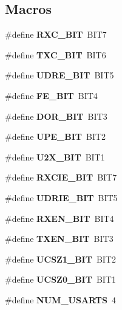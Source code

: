 \subsection*{Macros}
\begin{DoxyCompactItemize}
\item 
\#define {\bfseries R\+X\+C\+\_\+\+B\+I\+T}~B\+I\+T7\label{group__usart_async_module_ga2133aeaf30d1d8f6f819d2252dcdbe8c}

\item 
\#define {\bfseries T\+X\+C\+\_\+\+B\+I\+T}~B\+I\+T6\label{group__usart_async_module_ga6baa91108d3c2d172e44bc70956b98d2}

\item 
\#define {\bfseries U\+D\+R\+E\+\_\+\+B\+I\+T}~B\+I\+T5\label{group__usart_async_module_ga774a9a790e2e547044eddf47e931a1f8}

\item 
\#define {\bfseries F\+E\+\_\+\+B\+I\+T}~B\+I\+T4\label{group__usart_async_module_gaaee51057462df51f411e67a131165914}

\item 
\#define {\bfseries D\+O\+R\+\_\+\+B\+I\+T}~B\+I\+T3\label{group__usart_async_module_ga42bba56b7ce519d770f6791da46b3f64}

\item 
\#define {\bfseries U\+P\+E\+\_\+\+B\+I\+T}~B\+I\+T2\label{group__usart_async_module_gaaa081c9d68175cca9b7a57927616baf1}

\item 
\#define {\bfseries U2\+X\+\_\+\+B\+I\+T}~B\+I\+T1\label{group__usart_async_module_gaffd8feb2e774dd114102f1f8be6599aa}

\item 
\#define {\bfseries R\+X\+C\+I\+E\+\_\+\+B\+I\+T}~B\+I\+T7\label{group__usart_async_module_ga4155881309ac7b270c766149bc9a4bbd}

\item 
\#define {\bfseries U\+D\+R\+I\+E\+\_\+\+B\+I\+T}~B\+I\+T5\label{group__usart_async_module_gaf64c1f6cfda10c415407572973d3f71c}

\item 
\#define {\bfseries R\+X\+E\+N\+\_\+\+B\+I\+T}~B\+I\+T4\label{group__usart_async_module_ga906dab704ddcdb3d2d06384a94126c23}

\item 
\#define {\bfseries T\+X\+E\+N\+\_\+\+B\+I\+T}~B\+I\+T3\label{group__usart_async_module_gae3f799c1bacbb79826d19f6f68c9ddde}

\item 
\#define {\bfseries U\+C\+S\+Z1\+\_\+\+B\+I\+T}~B\+I\+T2\label{group__usart_async_module_ga9f7f7ba3dc9cf8409364251f5167589d}

\item 
\#define {\bfseries U\+C\+S\+Z0\+\_\+\+B\+I\+T}~B\+I\+T1\label{group__usart_async_module_gabc8fadc00f40b4574889185ded4f33f2}

\item 
\#define {\bfseries N\+U\+M\+\_\+\+U\+S\+A\+R\+T\+S}~4\label{group__usart_async_module_ga6829feca87a1bc576152b06505b91617}

\end{DoxyCompactItemize}
